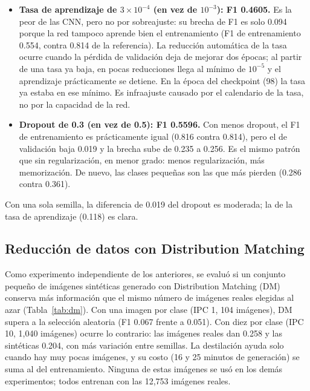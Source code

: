 \begin{itemize}
\item \textbf{Tasa de aprendizaje de $3\times10^{-4}$ (en vez de
$10^{-3}$): F1 0.4605.} Es la peor de las CNN, pero no por sobreajuste: su brecha
de F1 es solo 0.094 porque la red tampoco aprende bien el entrenamiento (F1 de
entrenamiento 0.554, contra 0.814 de la referencia). La reducción automática de
la tasa ocurre cuando la pérdida de validación deja de mejorar dos épocas; al
partir de una tasa ya baja, en pocas reducciones llega al mínimo de $10^{-5}$ y
el aprendizaje prácticamente se detiene. En la época del checkpoint (98) la tasa
ya estaba en ese mínimo. Es infraajuste causado por el calendario de la tasa, no
por la capacidad de la red.
\item \textbf{Dropout de 0.3 (en vez de 0.5): F1 0.5596.} Con menos dropout,
el F1 de entrenamiento es prácticamente igual (0.816 contra 0.814), pero el de
validación baja 0.019 y la brecha sube de 0.235 a 0.256. Es el mismo patrón que
sin regularización, en menor grado: menos regularización, más memorización. De
nuevo, las clases pequeñas son las que más pierden (0.286 contra 0.361).
\end{itemize}

Con una sola semilla, la diferencia de 0.019 del dropout es moderada; la de la
tasa de aprendizaje (0.118) es clara.



\subsection{Reducción de datos con Distribution Matching}
\label{sec:res-dm}

Como experimento independiente de los anteriores, se evaluó si un conjunto
pequeño de imágenes sintéticas generado con Distribution Matching (DM)
\autocite{zhao2023dm} conserva
más información que el mismo número de imágenes reales elegidas al azar
(Tabla~\ref{tab:dm}). Con una imagen por clase (IPC 1, 104 imágenes), DM supera
a la selección aleatoria (F1 0.067 frente a 0.051). Con diez por clase
(IPC 10, 1,040 imágenes) ocurre lo contrario: las imágenes reales dan 0.258 y
las sintéticas 0.204, con más variación entre semillas. La destilación ayuda
solo cuando hay muy pocas imágenes, y su costo (16 y 25 minutos de generación)
se suma al del entrenamiento. Ninguna de estas imágenes se usó en los demás
experimentos; todos entrenan con las 12,753 imágenes reales.



